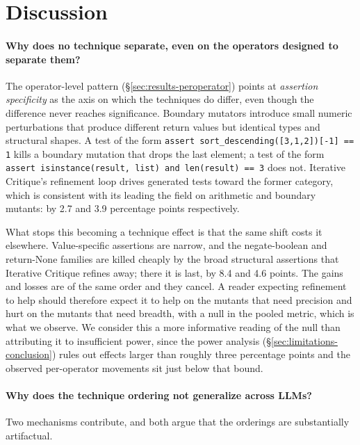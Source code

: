 \documentclass[smallextended]{svjour3}
\begin{document}
\section{Discussion}\label{sec:discussion}

\paragraph{Why does no technique separate, even on the operators
designed to separate them?}\label{sec:discussion-boundary}

The operator-level pattern (\S\ref{sec:results-peroperator}) points
at \emph{assertion specificity} as the axis on which the techniques do
differ, even though the difference never reaches significance.
Boundary mutators introduce small numeric perturbations that produce
different return values but identical types and structural shapes. A
test of the form \verb|assert sort_descending([3,1,2])[-1] == 1|
kills a boundary mutation that drops the last element; a test of the
form \verb|assert isinstance(result, list) and len(result) == 3|
does not. Iterative Critique's refinement loop drives generated
tests toward the former category, which is consistent with its
leading the field on arithmetic and boundary mutants: by 2.7 and
3.9 percentage points respectively.

What stops this becoming a technique effect is that the same shift
costs it elsewhere. Value-specific assertions are narrow, and the
negate-boolean and return-None families are killed cheaply by the
broad structural assertions that Iterative Critique refines away;
there it is last, by 8.4 and 4.6 points. The gains and losses are of
the same order and they cancel. A reader expecting refinement to
help should therefore expect it to help on the mutants that need
precision and hurt on the mutants that need breadth, with a null in
the pooled metric, which is what we observe. We consider this a
more informative reading of the null than attributing it to
insufficient power, since the power analysis
(\S\ref{sec:limitations-conclusion}) rules out effects larger than
roughly three percentage points and the observed per-operator
movements sit just below that bound.

\paragraph{Why does the technique ordering not generalize across LLMs?}
\label{sec:discussion-generalisability}

Two mechanisms contribute, and both argue that the orderings are
substantially artifactual.
\end{document}
